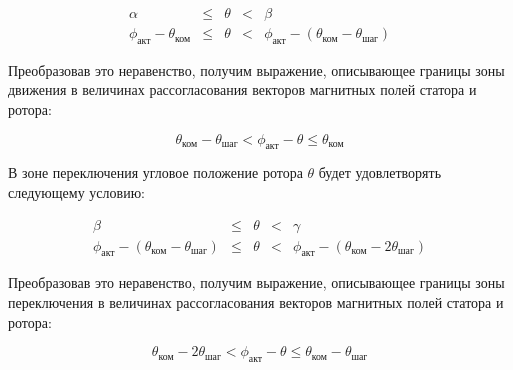 \begin{equation}
    \label{movement_zone_posit_dir_for_curr_pos}
    \begin{array}{ccccc}
        \alpha & \leq & \theta & < & \beta                                         \\
        \phi_\textit{акт} - \theta_\textit{ком}
        & \leq  & \theta
        & <     &\phi_\textit{акт} - (\theta_\textit{ком} - \theta_\textit{шаг})
    \end{array}
\end{equation}

Преобразовав это неравенство, получим выражение, описывающее границы зоны движения
в величинах рассогласования векторов магнитных полей статора и ротора:

\begin{equation}
    \label{movement_zone_posit_dir_for_delta}
    \theta_\textit{ком} - \theta_\textit{шаг}
    < \phi_\textit{акт} - \theta
    \leq \theta_\textit{ком}
\end{equation}

В зоне переключения угловое положение ротора $\theta$ будет удовлетворять следующему условию:

\begin{equation}
    \label{switch_zone_posit_dir_for_curr_pos}
    \begin{array}{ccccc}
        \beta & \leq & \theta & < & \gamma                                         \\
        \phi_\textit{акт} - (\theta_\textit{ком} - \theta_\textit{шаг})
        & \leq  & \theta
        & <     &\phi_\textit{акт} - (\theta_\textit{ком} - 2\theta_\textit{шаг})
    \end{array}
\end{equation}

Преобразовав это неравенство, получим выражение, описывающее границы зоны переключения
в величинах рассогласования векторов магнитных полей статора и ротора:

\begin{equation}
    \label{switch_zone_posit_dir_for_delta}
    \theta_\textit{ком} - 2\theta_\textit{шаг}
    < \phi_\textit{акт} - \theta
    \leq \theta_\textit{ком} - \theta_\textit{шаг}
\end{equation}


